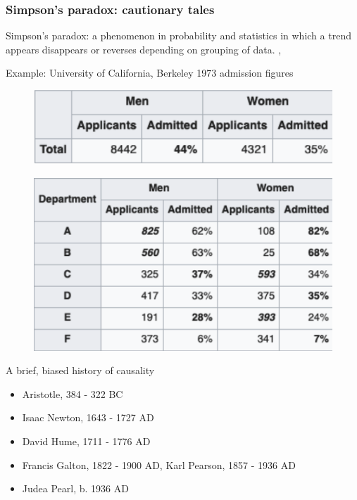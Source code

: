 \begin{frame}
    \frametitle{Simpson's paradox: cautionary tales}
    Simpson's paradox: a phenomenon in probability and statistics in which a trend appears disappears or reverses depending on grouping of data. \cite{simpson-wikipedia}, \cite{pearl2016causal} \newline

    Example: University of California, Berkeley 1973 admission figures\newline

    \begin{figure}[ht]
        \includegraphics[height=0.15\textheight]{graphics/berkeley}\newline
        \cite{freedman1998statistics}
    \end{figure}
    \begin{figure}[ht]
        \includegraphics[height=0.3\textheight]{graphics/berkeley_later}\newline
        \cite{Bickel398}
    \end{figure}
\end{frame}

\begin{frame}{A brief, biased history of causality}
    \begin{itemize}
        \item Aristotle, 384 - 322 BC
        \item Isaac Newton, 1643 - 1727 AD
        \item David Hume, 1711 - 1776 AD
        \item Francis Galton, 1822 - 1900 AD, Karl Pearson, 1857 - 1936 AD
        \item Judea Pearl, b. 1936 AD
    \end{itemize}
\end{frame}


